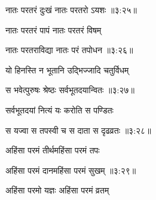 
{\devanagarifont नातः परतरं दुःखं नातः परतरो ऽयशः {॥३:२५॥} \veg\dontdisplaylinenum }%
 
{\devanagarifont नातः परतरं पापं नातः परतरं विषम् \thinspace{\dandab} \dontdisplaylinenum }%
 

{\devanagarifont नातः परतराविद्या नातः परं तपोधन {॥३:२६॥} \veg\dontdisplaylinenum }%

{\devanagarifont यो हिनस्ति न भूतानि उद्भिज्जादि चतुर्विधम् \thinspace{\dandab} \dontdisplaylinenum }%


{\devanagarifont स भवेत्पुरुषः श्रेष्ठः सर्वभूतदयान्वितः {॥३:२७॥} \veg\dontdisplaylinenum }%

{\devanagarifont सर्वभूतदयां नित्यं यः करोति स पण्डितः \thinspace{\dandab} \dontdisplaylinenum }%


{\devanagarifont स यज्वा स तपस्वी च स दाता स दृढव्रतः {॥३:२८॥} \veg\dontdisplaylinenum }%

{\devanagarifont अहिंसा परमं तीर्थमहिंसा परमं तपः \thinspace{\dandab} \dontdisplaylinenum }%


{\devanagarifont अहिंसा परमं दानमहिंसा परमं सुखम् {॥३:२९॥} \veg\dontdisplaylinenum }%
  
{\devanagarifont अहिंसा परमो यज्ञः अहिंसा परमं व्रतम् \thinspace{\dandab} \dontdisplaylinenum }%

